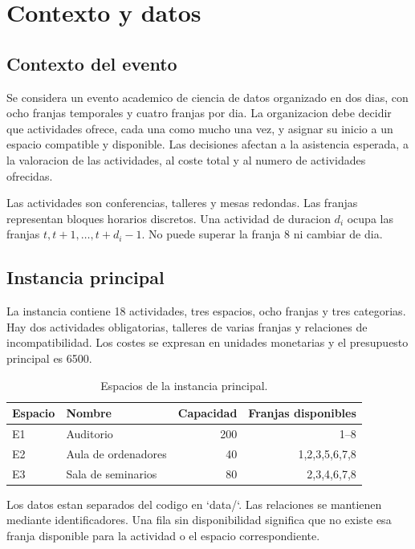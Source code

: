 \section{Contexto y datos}

\subsection{Contexto del evento}

Se considera un evento academico de ciencia de datos organizado en dos dias, con ocho franjas temporales y cuatro franjas por dia. La organizacion debe decidir que actividades ofrece, cada una como mucho una vez, y asignar su inicio a un espacio compatible y disponible. Las decisiones afectan a la asistencia esperada, a la valoracion de las actividades, al coste total y al numero de actividades ofrecidas.

Las actividades son conferencias, talleres y mesas redondas. Las franjas representan bloques horarios discretos. Una actividad de duracion $d_i$ ocupa las franjas $t,t+1,\ldots,t+d_i-1$. No puede superar la franja 8 ni cambiar de dia.

\subsection{Instancia principal}

La instancia contiene 18 actividades, tres espacios, ocho franjas y tres categorias. Hay dos actividades obligatorias, talleres de varias franjas y relaciones de incompatibilidad. Los costes se expresan en unidades monetarias y el presupuesto principal es 6500.

\begin{table}[h]
\centering
\begin{tabular}{llrr}
\hline
Espacio & Nombre & Capacidad & Franjas disponibles \\
\hline
E1 & Auditorio & 200 & 1--8 \\
E2 & Aula de ordenadores & 40 & 1,2,3,5,6,7,8 \\
E3 & Sala de seminarios & 80 & 2,3,4,6,7,8 \\
\hline
\end{tabular}
\caption{Espacios de la instancia principal.}
\end{table}

Los datos estan separados del codigo en `data/`. Las relaciones se mantienen mediante identificadores. Una fila sin disponibilidad significa que no existe esa franja disponible para la actividad o el espacio correspondiente.

